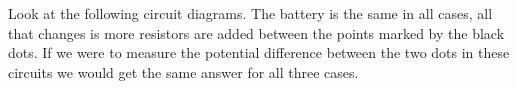 
Look at the following circuit diagrams. The battery is the same in all cases, all that changes is more resistors are added between the points marked by the black dots. If we were to measure the potential difference between the two dots in these circuits we would get the same answer for all three cases.


